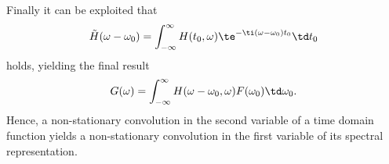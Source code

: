 Finally it can be exploited that
\begin{equation}
\tilde{H}(\omega-\omega_0) =  \int_{-\infty}^{\infty}  H(t_0,\omega)  \te^{-\ti (\omega-\omega_0) t_0}  \td t_0
\end{equation}
holds, yielding the final result
\begin{equation}
G(\omega) =  \int_{-\infty}^{\infty} H(\omega - \omega_0,\omega) F(\omega_0)  \td \omega_0.
\label{Eq:App:Non_stat_conv_fd}
\end{equation}
Hence, a non-stationary convolution in the second variable of a time domain function yields a non-stationary convolution in the first variable of its spectral representation.